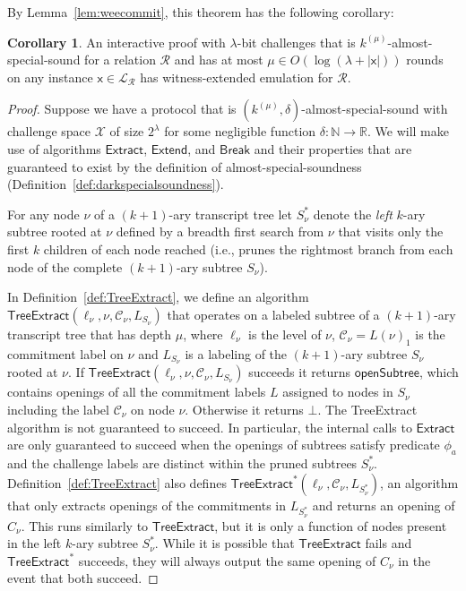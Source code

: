\documentclass{article}
\theoremstyle{definition}
\newtheorem{corollary}{Corollary}
\begin{document}
By Lemma~\ref{lem:weecommit}, this theorem has the following corollary:
\begin{corollary}
\label{cor:dsstowee}
An interactive proof with $\lambda$-bit challenges that is $k^{(\mu)}$-almost-special-sound for a relation $\mathcal{R}$ and has at most $\mu \in O(\log(\lambda + |\mathsf{x}|))$ rounds on any instance $\mathsf{x} \in \mathcal{L}_\mathcal{R}$ has witness-extended emulation for $\mathcal{R}$.  
\end{corollary}



\begin{proof} 
Suppose we have a protocol that is $(k^{(\mu)}, \delta)$-almost-special-sound with challenge space $\mathcal{X}$ of size $2^\lambda$ for some negligible function $\delta: \mathbb{N} \rightarrow \mathbb{R}$. We will make use of algorithms $\textsf{Extract}$, $\textsf{Extend}$, and $\textsf{Break}$ and their properties that are guaranteed to exist by the definition of almost-special-soundness (Definition~\ref{def:darkspecialsoundness}). 

For any node $\nu$ of a $(k+1)$-ary transcript tree let $S^*_\nu$ denote the \emph{left} $k$-ary subtree rooted at $\nu$ defined by a breadth first search from $\nu$ that visits only the first $k$ children of each node reached (i.e., prunes the rightmost branch from each node of the complete $(k+1)$-ary subtree $S_\nu$).

In Definition~\ref{def:TreeExtract}, we define an algorithm $\textsf{TreeExtract}(\ell_\nu, \nu, \mathcal{C}_\nu, L_{S_\nu})$ that operates on a labeled subtree of a $(k+1)$-ary transcript tree that has depth $\mu$,  where $\ell_\nu$ is the level of $\nu$, $\mathcal{C}_\nu = L(\nu)_1$ is the commitment label on $\nu$ and $L_{S_\nu}$ is a labeling of the $(k+1)$-ary subtree $S_\nu$ rooted at $\nu$. If $\textsf{TreeExtract}(\ell_\nu, \nu, \mathcal{C}_\nu, L_{S_\nu})$ succeeds it returns $\textsf{openSubtree}$, which contains openings of all the commitment labels $L$ assigned to nodes in $S_\nu$ including the label $\mathcal{C}_\nu$ on node $\nu$. Otherwise it returns $\bot$. The \textsf{TreeExtract} algorithm is not guaranteed to succeed. In particular, the internal calls to $\textsf{Extract}$ are only guaranteed to succeed when the openings of subtrees satisfy predicate $\phi_a$ and the challenge labels are distinct within the pruned subtrees $S^*_\nu$. Definition~\ref{def:TreeExtract} also defines $\textsf{TreeExtract}^*(\ell_\nu, \mathcal{C}_\nu, L_{S^*_\nu})$, an algorithm that only extracts openings of the commitments in $L_{S^*_\nu}$ and returns an opening of $C_\nu$. This runs similarly to $\textsf{TreeExtract}$, but it is only a function of nodes present in the left $k$-ary subtree $S^*_\nu$. While it is possible that $\textsf{TreeExtract}$ fails and $\textsf{TreeExtract}^*$ succeeds, they will always output the same opening of $C_\nu$ in the event that both succeed.


\end{proof}
\end{document}
